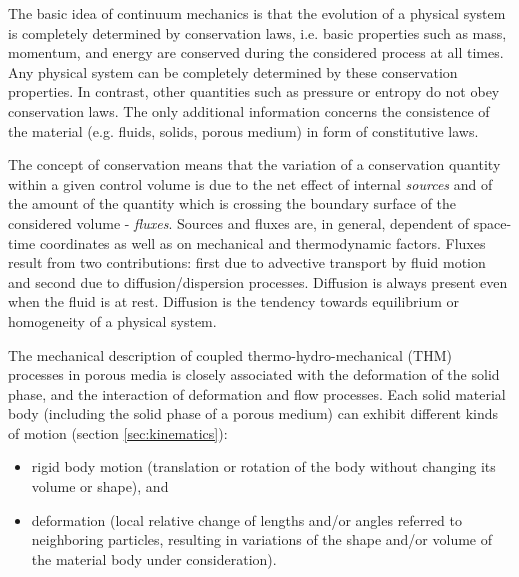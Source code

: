 
The basic idea of continuum mechanics is
that the evolution of a physical system is completely determined by conservation laws,
i.e. basic properties such as mass, momentum, and energy are conserved
during the considered process at all times.
Any physical system can be completely determined by these conservation properties.
In contrast,
other quantities such as pressure or entropy do not obey conservation laws.
The only additional information concerns the consistence of the material
(e.g. fluids, solids, porous medium) in form of constitutive laws.

The concept of conservation means
that the variation of a conservation quantity within a given control volume
is due to the net effect of internal {\it sources} and
of the amount of the quantity which is crossing the boundary surface
of the considered volume - {\it fluxes}.
Sources and fluxes are, in general, dependent of space-time coordinates as well as
on mechanical and thermodynamic factors.
Fluxes result from two contributions:
first due to advective transport by fluid motion and
second due to diffusion/dispersion processes.
Diffusion is always present even when the fluid is at rest.
Diffusion is the tendency towards equilibrium or homogeneity
of a physical system.


The mechanical description of coupled thermo-hydro-mechanical (THM) processes in porous media is closely associated with the deformation of the solid phase, and the interaction of deformation and flow processes. Each solid material body (including the solid phase of a porous medium) can exhibit different kinds of motion (section \ref{sec:kinematics}):

\begin{itemize}
\item rigid body motion (translation or rotation of the body without changing its volume or shape), and
\item deformation (local relative change of lengths and/or angles referred to neighboring particles, resulting in variations of the shape and/or volume of the material body under consideration).
\end{itemize}

